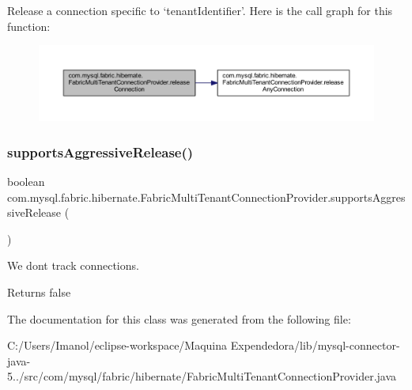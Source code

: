 Release a connection specific to `tenant\+Identifier'. Here is the call graph for this function\+:\nopagebreak
\begin{figure}[H]
\begin{center}
\leavevmode
\includegraphics[width=350pt]{classcom_1_1mysql_1_1fabric_1_1hibernate_1_1_fabric_multi_tenant_connection_provider_a7d6f77f42ea4f2e0c4569fbf4d58689d_cgraph}
\end{center}
\end{figure}
\mbox{\label{classcom_1_1mysql_1_1fabric_1_1hibernate_1_1_fabric_multi_tenant_connection_provider_a29afe74bb8f6de43ece2e3ee66924d1c}} 
\subsubsection{\texorpdfstring{supports\+Aggressive\+Release()}{supportsAggressiveRelease()}}
{\footnotesize\ttfamily boolean com.\+mysql.\+fabric.\+hibernate.\+Fabric\+Multi\+Tenant\+Connection\+Provider.\+supports\+Aggressive\+Release (\begin{DoxyParamCaption}{ }\end{DoxyParamCaption})}

We don\textquotesingle{}t track connections.

\begin{DoxyReturn}{Returns}
false 
\end{DoxyReturn}


The documentation for this class was generated from the following file\+:\begin{DoxyCompactItemize}
\item 
C\+:/\+Users/\+Imanol/eclipse-\/workspace/\+Maquina Expendedora/lib/mysql-\/connector-\/java-\/5../src/com/mysql/fabric/hibernate/Fabric\+Multi\+Tenant\+Connection\+Provider.\+java\end{DoxyCompactItemize}
